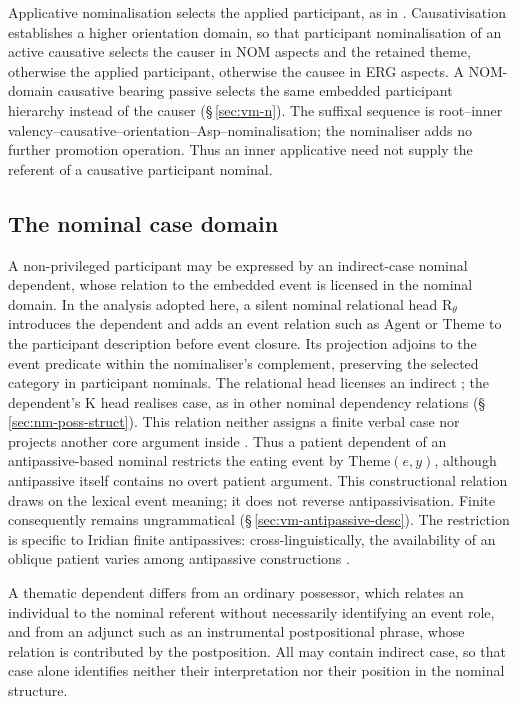 Applicative nominalisation selects the applied participant, as in
 .
Causativisation establishes a higher orientation domain, so that participant
nominalisation of an active causative selects the causer in NOM aspects and
the retained theme, otherwise the applied participant, otherwise the causee in
ERG aspects. A NOM-domain causative bearing passive  selects the
same embedded participant hierarchy instead of the causer
(§\,\ref{sec:vm-n}). The suffixal sequence is root--inner valency--causative--orientation--Asp--nominalisation;
the nominaliser adds no further promotion operation. Thus an inner applicative
need not supply the referent of a causative participant nominal.

\subsection{The nominal case domain}
A non-privileged participant may be expressed by an indirect-case nominal
dependent, whose relation to the embedded event is licensed in the nominal
domain. In the analysis adopted here, a silent nominal relational head
$\mathrm{R}_{\theta}$ introduces the dependent and adds an event relation
such as Agent or Theme to the participant description before event closure.
Its projection adjoins to the event predicate within the nominaliser's
complement, preserving the selected  category in participant
nominals. The relational head licenses an indirect ; the
dependent's K head realises case, as in other nominal dependency relations
(§\,\ref{sec:nm-poss-struct}). This relation neither assigns a finite verbal
case nor projects another core argument inside . Thus a patient
dependent of an antipassive-based nominal
restricts the eating event by Theme$(e,y)$, although antipassive
 itself contains no overt patient argument. This constructional
relation draws on the lexical event meaning; it does not reverse
antipassivisation. Finite  consequently remains
ungrammatical (§\,\ref{sec:vm-antipassive-desc}). The restriction is specific
to Iridian finite antipassives: cross-linguistically, the availability of an
oblique patient varies among antipassive constructions \cite{heaton2020}.

A thematic dependent differs from an ordinary possessor, which relates an
individual to the nominal referent without necessarily identifying an event
role, and from an adjunct such as an instrumental postpositional phrase,
whose relation is contributed by the postposition. All may contain indirect
case, so that case alone identifies neither their interpretation nor their
position in the nominal structure.

